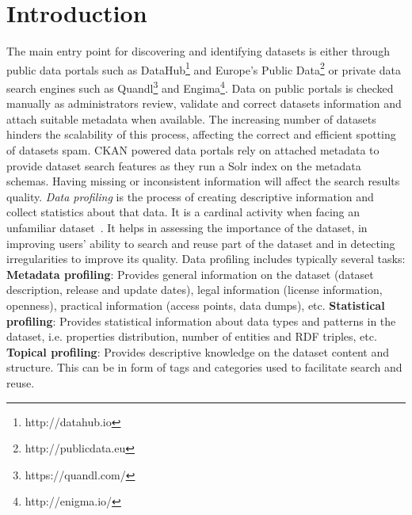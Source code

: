 \documentclass{sig-alternate}
\begin{document}

\section{Introduction}
The main entry point for discovering and identifying datasets is either through public data portals such as DataHub\footnote{http://datahub.io} and Europe's Public Data\footnote{http://publicdata.eu} or private data search engines such as Quandl\footnote{https://quandl.com/} and Engima\footnote{http://enigma.io/}. Data on public portals is checked manually as administrators review, validate and correct datasets information and attach suitable metadata when available. The increasing number of datasets hinders the scalability of this process, affecting the correct and efficient spotting of datasets spam.
CKAN powered data portals rely on attached metadata to provide dataset search features as they run a Solr index on the metadata schemas. Having missing or inconsistent information will affect the search results quality.
\textit{Data profiling} is the process of creating descriptive information and collect statistics about that data. It is a cardinal activity when facing an unfamiliar dataset~\cite{semwebprofiling}. It helps in assessing the importance of the dataset, in improving users' ability to search and reuse part of the dataset and in detecting irregularities to improve its quality. Data profiling includes typically several tasks:
\textbf{Metadata profiling}: Provides general information on the dataset (dataset description, release and update dates), legal information (license information, openness), practical information (access points, data dumps), etc. \textbf{Statistical profiling}: Provides statistical information about data types and patterns in the dataset, i.e. properties distribution, number of entities and RDF triples, etc. \textbf{Topical profiling}: Provides descriptive knowledge on the dataset content and structure. This can be in form of tags and categories used to facilitate search and reuse.
\end{document}
